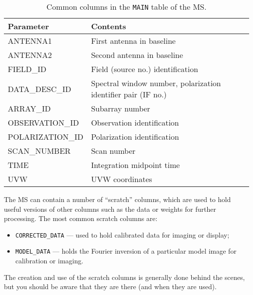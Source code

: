 \vspace{5mm}
\begin{table}[h!]
\caption[Common MS Columns]
        {\label{tabselect} Common columns in the {\tt MAIN} table of
        the MS.}
\begin{center}
\begin{tabular}{|ll|} \hline
{\bf Parameter}   &   {\bf Contents}                  \\
\hline
\hline
ANTENNA1      &   First antenna in baseline   \\
ANTENNA2      &   Second antenna in baseline  \\
FIELD\_ID      &   Field (source no.) identification  \\
DATA\_DESC\_ID  &   Spectral window number, polarization identifier pair (IF no.)  \\
ARRAY\_ID      &   Subarray number                \\
OBSERVATION\_ID  &   Observation identification   \\
POLARIZATION\_ID  &   Polarization identification \\ 
SCAN\_NUMBER   &   Scan number                    \\
TIME          &   Integration midpoint time      \\
UVW           &   UVW coordinates                \\
\hline
\end{tabular}
\end{center}
\end{table}

The MS can contain a number of ``scratch'' columns, which are used to
hold useful versions of other columns such as the data or weights
for further processing.  The most common scratch columns are:
\begin{itemize}
\item {\tt CORRECTED\_DATA} --- used to hold calibrated data for
  imaging or display;
\item {\tt MODEL\_DATA} --- holds the Fourier inversion of a
  particular model image for calibration or imaging.
\end{itemize}
The creation and use of the scratch columns is generally done behind the scenes, but you
should be aware that they are there (and when they are used).

